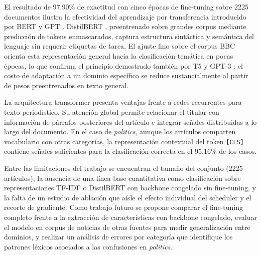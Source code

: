 \documentclass[letterpaper, 10 pt, conference]{latex_template/ieeeconf}
\begin{document}
El resultado de 97.90\% de exactitud con cinco épocas de fine-tuning sobre 2225 documentos ilustra la efectividad del aprendizaje por transferencia introducido por BERT \cite{c2} y GPT \cite{c3}. DistilBERT \cite{c5}, preentrenado sobre grandes corpus mediante predicción de tokens enmascarados, captura estructura sintáctica y semántica del lenguaje sin requerir etiquetas de tarea. El ajuste fino sobre el corpus BBC orienta esta representación general hacia la clasificación temática en pocas épocas, lo que confirma el principio demostrado también por T5 \cite{c6} y GPT-3 \cite{c7}: el costo de adaptación a un dominio específico se reduce sustancialmente al partir de pesos preentrenados en texto general.

La arquitectura transformer \cite{c1} presenta ventajas frente a redes recurrentes para texto periodístico. Su atención global permite relacionar el titular con información de párrafos posteriores del artículo e integrar señales distribuidas a lo largo del documento. En el caso de \textit{politics}, aunque los artículos comparten vocabulario con otras categorías, la representación contextual del token \texttt{[CLS]} contiene señales suficientes para la clasificación correcta en el 95.16\% de los casos.

Entre las limitaciones del trabajo se encuentran el tamaño del conjunto (2225 artículos), la ausencia de una línea base cuantitativa como clasificación sobre representaciones TF-IDF o DistilBERT con backbone congelado sin fine-tuning, y la falta de un estudio de ablación que aísle el efecto individual del scheduler y el recorte de gradiente. Como trabajo futuro se propone comparar el fine-tuning completo frente a la extracción de características con backbone congelado, evaluar el modelo en corpus de noticias de otras fuentes para medir generalización entre dominios, y realizar un análisis de errores por categoría que identifique los patrones léxicos asociados a las confusiones en \textit{politics}.
\end{document}
